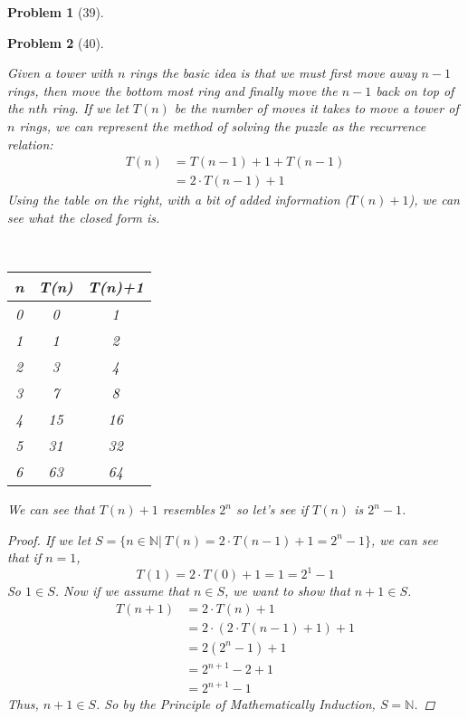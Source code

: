 \documentclass{article}
\theoremstyle{problem}
\newtheorem{prob}{Problem}
\theoremstyle{plain}
\begin{document}
\begin{prob}[39]
\begin{enumerate}[a)]
  \end{enumerate}
\end{prob}

\begin{prob}[40]
  \begin{multicols}{2}
    Given a tower with $n$ rings the basic idea is that we must first move away $n-1$ rings, then move the bottom most ring and finally move the $n-1$ back on top of the $nth$ ring. If we let $T(n)$ be the number of moves it takes to move a tower of $n$ rings, we can represent the method of solving the puzzle as the recurrence relation:
\begin{align*}
T(n) &= T(n-1) + 1 + T(n - 1)\\
     &= 2\cdot T(n - 1) + 1
\end{align*}
Using the table on the right, with a bit of added information ($T(n)+1$), we can see what the closed form is.
    \vfill
    \columnbreak
    \begin{center}\ \\[1cm]
      \begin{tabular}{c|c c}
        n & T(n) & T(n)+1\\
        \hline
        0 & 0 & 1\\
        1 & 1 & 2\\
        2 & 3 & 4\\
        3 & 7 & 8\\
        4 & 15& 16\\
        5 & 31& 32\\
        6 & 63& 64
      \end{tabular}
  \end{center}
\end{multicols}
  We can see that $T(n) + 1$ resembles $2^n$ so let's see if $T(n)$ is $2^n - 1$. 
\begin{proof}
If we let $S = \{n \in \mathbb{N}|\ T(n) = 2\cdot T(n-1) + 1 = 2^n -1\}$, we can see that if $n = 1$,
$$
  T(1) = 2\cdot T(0) +1 = 1 = 2^1 - 1
$$
So $1 \in S$. Now if we assume that $n \in S$, we want to show that $n + 1 \in S$.
\begin{align*}
  T(n+1) &= 2\cdot T(n) + 1\\
         &= 2\cdot (2\cdot T(n-1) + 1) + 1\\
         &= 2 (2^n - 1) + 1\\
         &= 2^{n+1} - 2 + 1\\
         &= 2^{n+1} - 1
\end{align*}
Thus, $n + 1 \in S$. So by the Principle of Mathematically Induction, $S = \mathbb{N}$.
\end{proof}
\end{prob}
\end{document}

